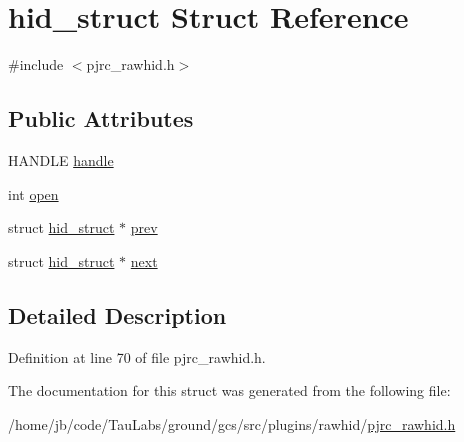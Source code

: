 \hypertarget{structhid__struct}{\section{hid\-\_\-struct \-Struct \-Reference}
\label{structhid__struct}
}


{\ttfamily \#include $<$pjrc\-\_\-rawhid.\-h$>$}

\subsection*{\-Public \-Attributes}
\begin{DoxyCompactItemize}
\item 
\-H\-A\-N\-D\-L\-E \hyperlink{group___raw_h_i_d_plugin_ga525aec9724c39727f65905e53be6a973}{handle}
\item 
int \hyperlink{group___raw_h_i_d_plugin_gac3065ab2f0080eb3fe182cad3fff15ee}{open}
\item 
struct \hyperlink{structhid__struct}{hid\-\_\-struct} $\ast$ \hyperlink{group___raw_h_i_d_plugin_gac0d9fa3480e665ae9aca8a621a1dc66d}{prev}
\item 
struct \hyperlink{structhid__struct}{hid\-\_\-struct} $\ast$ \hyperlink{group___raw_h_i_d_plugin_gafe069ce715c9b005340052f4ea9f1a62}{next}
\end{DoxyCompactItemize}


\subsection{\-Detailed \-Description}


\-Definition at line 70 of file pjrc\-\_\-rawhid.\-h.



\-The documentation for this struct was generated from the following file\-:\begin{DoxyCompactItemize}
\item 
/home/jb/code/\-Tau\-Labs/ground/gcs/src/plugins/rawhid/\hyperlink{pjrc__rawhid_8h}{pjrc\-\_\-rawhid.\-h}\end{DoxyCompactItemize}
